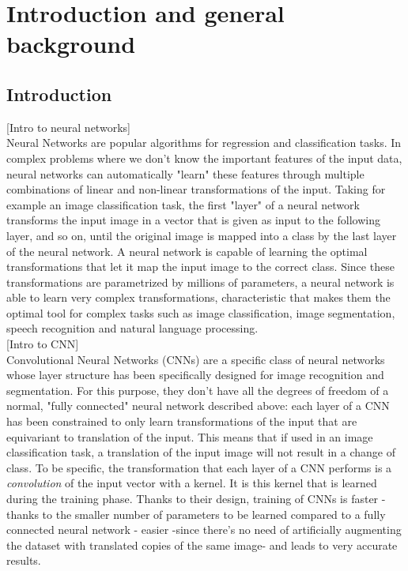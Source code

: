 

\setcounter{page}{1}



\section {Introduction and general background} 

\subsection{Introduction}

[Intro to neural networks]\\
Neural Networks are popular algorithms for regression and classification tasks. In complex problems where we don't know the important features of the input data, neural networks can automatically "learn" these features through multiple combinations of linear and non-linear transformations of the input. Taking for example an image classification task, the first "layer" of a neural network transforms the input image in a vector that is given as input to the following layer, and so on, until the original image is mapped into a class by the last layer of the neural network. A neural network is capable of learning the optimal transformations that let it map the input image to the correct class. Since these transformations are parametrized by millions of parameters, a neural network is able to learn very complex transformations, characteristic that makes them the optimal tool for complex tasks such as image classification, image segmentation, speech recognition and natural language processing.\\

[Intro to CNN]\\
Convolutional Neural Networks (CNNs) are a specific class of neural networks whose layer structure has been specifically designed for image recognition and segmentation. For this purpose, they don't have all the degrees of freedom of a normal, "fully connected" neural network described above: each layer of a CNN has been constrained to only learn transformations of the input that are equivariant to translation of the input. This means that if used in an image classification task, a translation of the input image will not result in a change of class. To be specific, the transformation that each layer of a CNN performs is a \textit{convolution} of the input vector with a kernel. It is this kernel that is learned during the training phase. Thanks to their design, training of CNNs is faster - thanks to the smaller number of parameters to be learned compared to a fully connected neural network - easier -since there's no need of artificially augmenting the dataset with translated copies of the same image- and leads to very accurate results.\\

